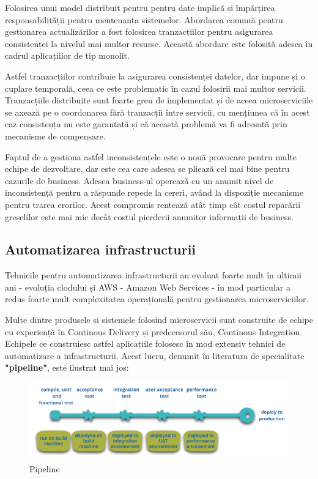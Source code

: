 \documentclass[12pt, a4paper, oneside, romanian]{teza-upb}
\begin{document}
Folosirea unui model distribuit pentru pentru date implică și împărțirea responsabilității pentru mentenanța sistemelor. Abordarea comună pentru gestionarea actualizărilor a fost folosirea tranzacțiilor pentru asigurarea consistenței la nivelul mai multor resurse. Această abordare este folosită adesea în cadrul aplicațiilor de tip monolit. 

Astfel tranzacțiilor contribuie la asigurarea consistenței datelor, dar impune și o cuplare temporală, ceea ce este problematic în cazul folosirii mai multor servicii. Tranzacțiile distribuite sunt foarte greu de implementat și de aceea microserviciile se axează pe o coordonarea fără tranzacții între servicii, cu mențiunea că în acest caz consistența nu este garantată și că această problemă va fi adresată prin mecanisme de compensare. 

Faptul de a gestiona astfel inconsistențele este o nouă provocare pentru multe echipe de dezvoltare, dar este cea care adesea se pliează cel mai bine pentru cazurile de business. Adesea business-ul operează cu un anumit nivel de inconsistență pentru a răspunde repede la cereri, având la dispoziție mecanisme pentru trarea erorilor. Acest compromis rentează atât timp cât costul reparării greșelilor este mai mic decât costul pierderii anumitor informații de business. 	

\subsection{Automatizarea infrastructurii}

Tehnicile pentru automatizarea infrastructurii au evoluat foarte mult în ultimii ani - evoluția clodului și AWS - Amazon Web Services - în mod particular a redus foarte mult complexitatea operațională pentru gestionarea microserviciilor. 

Multe dintre produsele și sistemele folosind microservicii sunt construite de echipe cu experiență în Continous Delivery și predecesorul său, Continous Integration. Echipele ce construiesc astfel aplicațiile folosesc în mod extensiv tehnici de automatizare a infrastructurii. Acest lucru, denumit în literatura de specialitate \textbf{"pipeline"}, este ilustrat mai jos:

\begin{figure}[ht]
\centering
\includegraphics[scale=0.6]{img/basic-pipeline.png}
\caption{Pipeline}
\label{fig:arhi_componente}
\end{figure}
\end{document}
